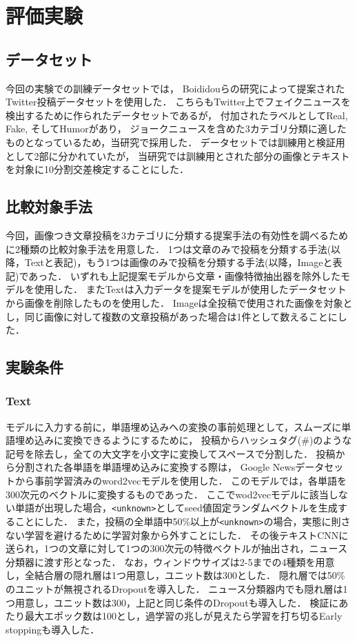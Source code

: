 %
\section{評価実験}
\label{ch:experiment}
%
\subsection{データセット}
今回の実験での訓練データセットでは，
Boididouらの研究\cite{boididou2015verifying}によって提案されたTwitter投稿データセットを使用した．
こちらもTwitter上でフェイクニュースを検出するために作られたデータセットであるが，
付加されたラベルとしてReal, Fake, そしてHumorがあり，
ジョークニュースを含めた3カテゴリ分類に適したものとなっているため，当研究で採用した．
データセットでは訓練用と検証用として2部に分かれていたが，
当研究では訓練用とされた部分の画像とテキストを対象に10分割交差検定することにした．

% 
\subsection{比較対象手法}
今回，画像つき文章投稿を3カテゴリに分類する提案手法の有効性を調べるために2種類の比較対象手法を用意した．
1つは文章のみで投稿を分類する手法(以降，Textと表記)，もう1つは画像のみで投稿を分類する手法(以降，Imageと表記)であった．
いずれも上記提案モデルから文章・画像特徴抽出器を除外したモデルを使用した．
またTextは入力データを提案モデルが使用したデータセットから画像を削除したものを使用した．
Imageは全投稿で使用された画像を対象とし，同じ画像に対して複数の文章投稿があった場合は1件として数えることにした．
% 
\subsection{実験条件}
%
\subsubsection{Text}
モデルに入力する前に，単語埋め込みへの変換の事前処理として，スムーズに単語埋め込みに変換できるようにするために，
投稿からハッシュタグ(\#)のような記号を除去し，全ての大文字を小文字に変換してスペースで分割した．
投稿から分割された各単語を単語埋め込みに変換する際は，
Google Newsデータセットから事前学習済みのword2vecモデル\cite{google_2013}を使用した．
このモデルでは，各単語を300次元のベクトルに変換するものであった．
ここでwod2vecモデルに該当しない単語が出現した場合，\texttt{<unknown>}としてseed値固定ランダムベクトルを生成することにした．
また，投稿の全単語中50\%以上が\texttt{<unknown>}の場合，実態に則さない学習を避けるために学習対象から外すことにした．
その後テキストCNNに送られ，1つの文章に対して1つの300次元の特徴ベクトルが抽出され，ニュース分類器に渡す形となった．
なお，ウィンドウサイズは2-5までの4種類を用意し，全結合層の隠れ層は1つ用意し，ユニット数は300とした．
隠れ層では50\%のユニットが無視されるDropoutを導入した．
ニュース分類器内でも隠れ層は1つ用意し，ユニット数は300，上記と同じ条件のDropoutも導入した．
検証にあたり最大エポック数は100とし，過学習の兆しが見えたら学習を打ち切るEarly stoppingも導入した．
%
